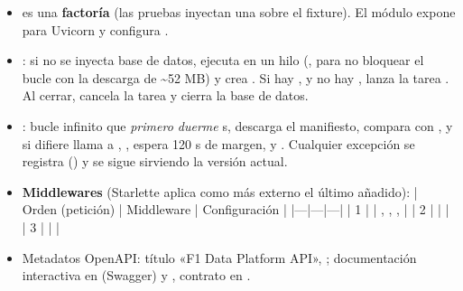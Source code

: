 \begin{itemize}
\item {} es una \textbf{factoría} (las pruebas inyectan una  sobre el fixture). El módulo expone  para Uvicorn y configura .
\item \textbf{}: si no se inyecta base de datos, ejecuta  en un hilo (, para no bloquear el bucle con la descarga de \textasciitilde{}52 MB) y crea . Si hay ,  y no hay , lanza la tarea . Al cerrar, cancela la tarea y cierra la base de datos.
\item \textbf{}: bucle infinito que \emph{primero duerme}  s, descarga el manifiesto, compara  con , y si difiere llama a , , espera 120 s de margen,  y . Cualquier excepción se registra () y se sigue sirviendo la versión actual.
\item \textbf{Middlewares} (Starlette aplica como más externo el último añadido): | Orden (petición) | Middleware | Configuración | |---|---|---| | 1 |  | , , ,  | | 2 |  |  | | 3 |  |  |
\item Metadatos OpenAPI: título «F1 Data Platform API», ; documentación interactiva en  (Swagger) y , contrato en .
\end{itemize}

